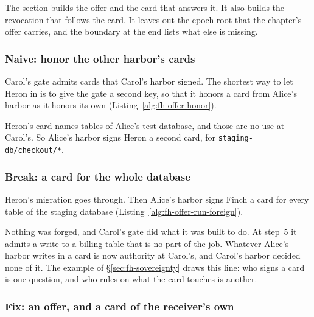 The section builds the offer and the card that answers it. It also builds
the revocation that follows the card. It leaves out the epoch root that
the chapter's offer carries, and the boundary at the end lists what else
is missing.

\subsubsection{Naive: honor the other harbor's cards}

Carol's gate admits cards that Carol's harbor signed. The shortest way to
let Heron in is to give the gate a second key, so that it honors a card
from Alice's harbor as it honors its own
(Listing~\ref{alg:fh-offer-honor}).


Heron's card names tables of Alice's test database, and those are no use
at Carol's. So Alice's harbor signs Heron a second card, for
\texttt{staging-db/checkout/*}.

\subsubsection{Break: a card for the whole database}

Heron's migration goes through. Then Alice's harbor signs Finch a card
for every table of the staging database
(Listing~\ref{alg:fh-offer-run-foreign}).


Nothing was forged, and Carol's gate did what it was built to do. At
step~5 it admits a write to a billing table that is no part of the job.
Whatever Alice's harbor writes in a card is now authority at Carol's, and
Carol's harbor decided none of it. The example of
\S\ref{sec:fh-sovereignty} draws this line: who signs a card is one
question, and who rules on what the card touches is another.

\subsubsection{Fix: an offer, and a card of the receiver's own}

